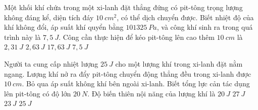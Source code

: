 \begin{ex}
Một khối khí chứa trong một xi-lanh đặt thẳng đứng có pit-tông trọng lượng không đáng kể, diện tích đáy $10 \ cm^2$, có thể dịch chuyển được. Biết nhiệt độ của khí không đổi, áp suất khí quyển bằng $101325\ Pa$, và công khí sinh ra trong quá trình này là $7,5\ J$. Công cần thực hiện để kéo pit-tông lên cao thêm $10 \ cm$ là
\choice
{$2,31\ J$}
{\True $2,63\ J$}
{$17,63\ J$}
{$7,5\ J$}
	
	\end{ex}


\begin{ex}
Người ta cung cấp nhiệt lượng $25 \ J$ cho một lượng khí trong xi-lanh đặt nằm ngang. Lượng khí nở ra đẩy pit-tông chuyển động thẳng đều trong xi-lanh được $10 \ cm$. Bỏ qua áp suất không khí bên ngoài xi-lanh. Biết tổng lực cản tác dụng lên pit-tông có độ lớn $20 \ N$. Độ biến thiên nội năng của lượng khí là
\choice
{$20 \ J$}
{$27 \ J$}
{\True $23 \ J$}
{$25 \ J$}
\end{ex}













